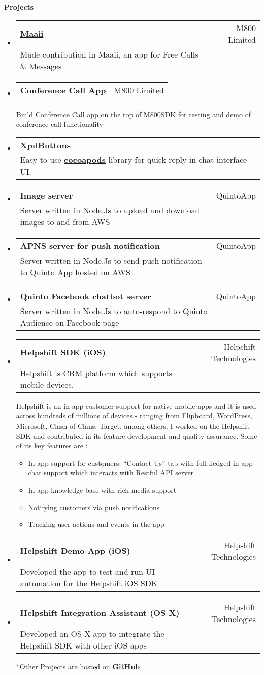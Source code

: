 \documentclass[letterpaper,11pt]{article}
\makeatletter
\newcommand{\resitem}[1]{\item #1 \vspace{-2pt}}
\newcommand{\resheading}[1]{{\large \colorbox{mygrey}{\begin{minipage}{\textwidth}{\textbf{#1 \vphantom{p\^{E}}}}\end{minipage}}}}
\newcommand{\ressubheading}[3]{
\begin{tabular*}{6.5in}{l@{\extracolsep{\fill}}r}
	\textbf{#1} & #2\\
	{#3} \\
\end{tabular*}\vspace{-6pt}
}
\makeatother
\begin{document}
\resheading{Projects}
\begin{itemize}
\item 
	\ressubheading{\href{https://itunes.apple.com/hk/app/id488051175}{Maaii}}{M800 Limited}{Made contribution in Maaii, an app for Free Calls \& Messages}
\item
	\ressubheading{Conference Call App}{M800 Limited}{}{Build Conference Call app on the top of M800SDK for testing and demo of conference call functionality}
\item 
	\ressubheading{\href{https://cocoapods.org/pods/XpdButtons}{XpdButtons}}{}{Easy to use \href{https://cocoapods.org/pods/XpdButtons}{\textbf{cocoapods}} library for quick reply in chat interface UI.}
\item 
	\ressubheading{Image server}{QuintoApp}{Server written in Node.Js to upload and download images to and from AWS}
\item
	\ressubheading{APNS server for push notification}{QuintoApp}{Server written in Node.Js to send push notification to Quinto App hosted on AWS}
\item
	\ressubheading{Quinto Facebook chatbot server}{QuintoApp}{Server written in Node.Js to auto-respond to Quinto Audience on Facebook page}	
\item
	\ressubheading{Helpshift SDK (iOS)}{Helpshift Technologies}{Helpshift is \href{https://en.wikipedia.org/wiki/Customer_relationship_management}{CRM platform} which supports mobile devices.}
 

			{\small Helpshift is an in-app customer support for native mobile apps and it is used across hundreds of millions of devices - ranging from Flipboard, WordPress, Microsoft, Clash of Clans, Target, among others. I worked on the Helpshift SDK and contributed in its feature development and quality assurance. Some of its key features are :}
		{ \footnotesize
		\begin{itemize}
			\resitem{In-app support for customers: “Contact Us” tab with full-fledged in-app chat support which interacts with Restful API server}
			\resitem{In-app knowledge base with rich media support}
			\resitem{Notifying customers via push notifications}
			\resitem{Tracking user actions and events in the app}
		\end{itemize}
		}
   \item
	\ressubheading{Helpshift Demo App (iOS)}{Helpshift Technologies}{Developed the app to test and run UI automation for the Helpshift iOS SDK}	
\item
	\ressubheading{Helpshift Integration Assistant (OS X)}{Helpshift Technologies}{Developed an OS-X app to integrate the Helpshift SDK with other iOS apps}
	{ \footnotesize
	
		{\tiny **Other Projects are hosted on \href{http://www.github.com/xpd54}{\textbf{GitHub}}}
	}
\end{itemize}  %
\end{document}
